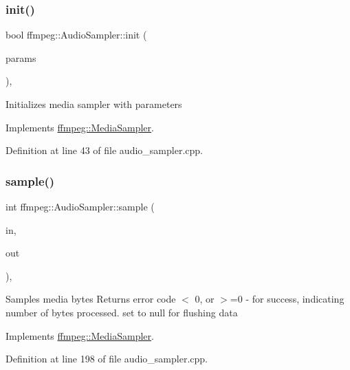 \subsubsection{\texorpdfstring{init()}{init()}}
{\footnotesize\ttfamily bool ffmpeg\+::\+Audio\+Sampler\+::init (\begin{DoxyParamCaption}\item[{const \hyperlink{structffmpeg_1_1SamplerParameters}{Sampler\+Parameters} \&}]{params }\end{DoxyParamCaption})\hspace{0.3cm}{\ttfamily [override]}, {\ttfamily [virtual]}}

Initializes media sampler with parameters 

Implements \hyperlink{classffmpeg_1_1MediaSampler_a049962d62fc930c67d6cf5aa89ae1948}{ffmpeg\+::\+Media\+Sampler}.



Definition at line 43 of file audio\+\_\+sampler.\+cpp.

\mbox{\label{classffmpeg_1_1AudioSampler_a2188529ebad9ef4593a5ab11e8236989}} 
\subsubsection{\texorpdfstring{sample()}{sample()}}
{\footnotesize\ttfamily int ffmpeg\+::\+Audio\+Sampler\+::sample (\begin{DoxyParamCaption}\item[{const \hyperlink{classffmpeg_1_1ByteStorage}{Byte\+Storage} $\ast$}]{in,  }\item[{\hyperlink{classffmpeg_1_1ByteStorage}{Byte\+Storage} $\ast$}]{out }\end{DoxyParamCaption})\hspace{0.3cm}{\ttfamily [override]}, {\ttfamily [virtual]}}

Samples media bytes Returns error code $<$ 0, or $>$=0 -\/ for success, indicating number of bytes processed. set  to null for flushing data 

Implements \hyperlink{classffmpeg_1_1MediaSampler_a1e13816018edada455769f027cf5e9dd}{ffmpeg\+::\+Media\+Sampler}.



Definition at line 198 of file audio\+\_\+sampler.\+cpp.


